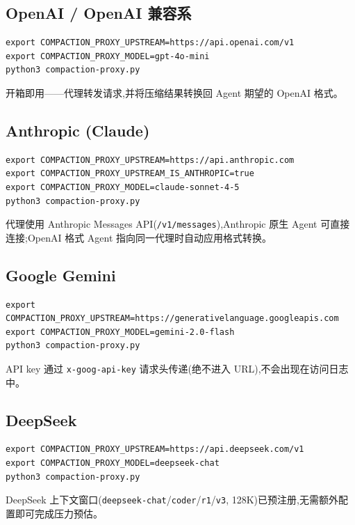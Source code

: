 \documentclass[11pt,a4paper]{article}
\begin{document}
\subsection{OpenAI / OpenAI 兼容系}

\begin{lstlisting}
export COMPACTION_PROXY_UPSTREAM=https://api.openai.com/v1
export COMPACTION_PROXY_MODEL=gpt-4o-mini
python3 compaction-proxy.py
\end{lstlisting}

开箱即用——代理转发请求,并将压缩结果转换回 Agent 期望的 OpenAI 格式。

\subsection{Anthropic (Claude)}

\begin{lstlisting}
export COMPACTION_PROXY_UPSTREAM=https://api.anthropic.com
export COMPACTION_PROXY_UPSTREAM_IS_ANTHROPIC=true
export COMPACTION_PROXY_MODEL=claude-sonnet-4-5
python3 compaction-proxy.py
\end{lstlisting}

代理使用 Anthropic Messages API(\texttt{/v1/messages}),Anthropic 原生 Agent
可直接连接;OpenAI 格式 Agent 指向同一代理时自动应用格式转换。

\subsection{Google Gemini}

\begin{lstlisting}
export COMPACTION_PROXY_UPSTREAM=https://generativelanguage.googleapis.com
export COMPACTION_PROXY_MODEL=gemini-2.0-flash
python3 compaction-proxy.py
\end{lstlisting}

API key 通过 \texttt{x-goog-api-key} 请求头传递(绝不进入 URL),不会出现在访问日志中。

\subsection{DeepSeek}

\begin{lstlisting}
export COMPACTION_PROXY_UPSTREAM=https://api.deepseek.com/v1
export COMPACTION_PROXY_MODEL=deepseek-chat
python3 compaction-proxy.py
\end{lstlisting}

DeepSeek 上下文窗口(\texttt{deepseek-chat}/\texttt{coder}/\texttt{r1}/\texttt{v3},
128K)已预注册,无需额外配置即可完成压力预估。
\end{document}
